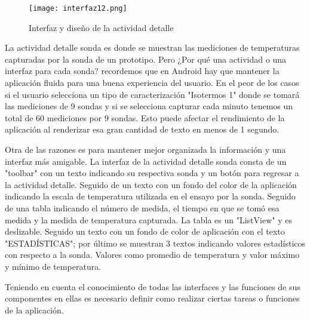 \begin{figure}[H]
	\centering
	\texttt{[image: interfaz12.png]}
	\caption{Interfaz y diseño de la actividad detalle}
\end{figure}

\par \noindent
La actividad detalle sonda es donde se muestran las mediciones de temperaturas capturadas por la sonda de un prototipo. Pero ¿Por qué una actividad o una interfaz para cada sonda? recordemos que en Android hay que mantener la aplicación fluida para una buena experiencia del usuario. En el peor de los casos si el usuario selecciona un tipo de caracterización "Isotermos 1" donde se tomará las mediciones de 9 sondas y si se selecciona capturar cada minuto tenemos un total de 60 mediciones por 9 sondas. Esto puede afectar el rendimiento de la aplicación al renderizar esa gran cantidad de texto en menos de 1 segundo.

\par \noindent
Otra de las razones es para mantener mejor organizada la información y una interfaz más amigable. La interfaz de la actividad detalle sonda consta de un "toolbar" con un texto indicando su respectiva sonda y un botón para regresar a la actividad detalle. Seguido de un texto con un fondo del color de la aplicación indicando la escala de temperatura utilizada en el ensayo por la sonda. Seguido de una tabla indicando el número de medida, el tiempo en que se tomó esa medida y la medida de temperatura capturada. La tabla es un "ListView" y es deslizable. Seguido un texto con un fondo de color de aplicación con el texto "ESTADÍSTICAS"; por último se muestran 3 textos indicando valores estadísticos con respecto a la sonda. Valores como promedio de temperatura y valor máximo y mínimo de temperatura.

\par \noindent
Teniendo en cuenta el conocimiento de todas las interfaces y las funciones de sus componentes en ellas es necesario definir como realizar ciertas tareas o funciones de la aplicación.
